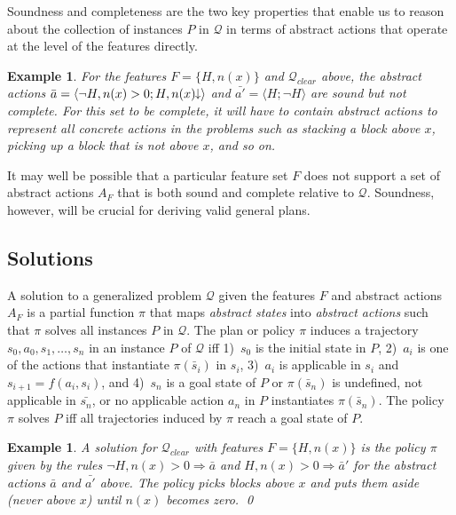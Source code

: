 \documentclass[letterpaper]{article} %
\newcommand{\tup}[1]{\langle #1 \rangle}
\newtheorem{example}[definition]{Example}
\newcommand{\Q}{\mathcal{Q}}
\newcommand{\abst}[2]{\tup{#1;#2}}
\newcommand{\Rule}[2]{\ensuremath{#1 \Rightarrow #2}}
\newcommand{\mminus}{\hspace{-.05em}\raisebox{.15ex}{\footnotesize$\downarrow$}}
\begin{document}
Soundness and completeness are the two key  properties that  enable us to reason about the collection of
instances $P$ in $\Q$ in terms of abstract actions that operate at the level of the  features directly.

\begin{example}
  For the features  $F=\{H,n(x)\}$ and  $\Q_{clear}$ above, 
  the abstract actions    $\bar{a}=\abst{\neg H,n(x)>0}{H,n(x)\mminus}$
  and $\bar{a'}=\abst{H}{\neg H}$ are  sound but not complete.
  For this set to be complete,  it will have to contain abstract actions to represent
  all concrete actions in the problems such as stacking a block above $x$, picking up a block that is not above $x$, and so on.
\end{example}

It may well be possible that a particular feature set $F$ does not  support a set of abstract actions $A_F$
that is both sound and complete relative to $\Q$. Soundness, however, will be  crucial for deriving valid general plans.


\subsection{Solutions}

A solution to a generalized problem $\Q$ given the features $F$ and abstract
actions $A_F$ is a partial function $\pi$ that maps \emph{abstract states}
into \emph{abstract actions} such that $\pi$ solves all instances $P$ in $\Q$.
The plan or policy $\pi$ induces a trajectory $s_0,a_0,s_1, \ldots, s_n$ in
an instance $P$ of $\Q$ iff
1)~$s_0$ is the initial state in $P$,
2)~$a_i$ is one of the actions that instantiate $\pi(\bar{s}_i)$ in $s_i$,
3)~$a_i$ is applicable in $s_i$ and $s_{i+1}=f(a_i,s_i)$, and
4)~$s_n$ is a goal state of $P$  or  $\pi(\bar{s}_n)$ is 
undefined,  not applicable in $\bar{s_n}$, or no applicable action $a_n$ in $P$ instantiates $\pi(\bar{s}_n)$.
The policy $\pi$ solves $P$ iff all trajectories induced by $\pi$  reach a goal state of $P$.

\begin{example}
  A solution for $\Q_{clear}$ with features  $F=\{H,n(x)\}$ is the policy $\pi$ given by the rules
  $\Rule{\neg H, n(x)>0}{\bar{a}}$ and $\Rule{H, n(x)>0}{\bar{a}'}$
  for the abstract actions $\bar{a}$ and $\bar{a'}$ above.
  The policy picks blocks above $x$ and puts them aside (never  above $x$)
  until $n(x)$ becomes zero. \qed
\end{example}
\end{document}
